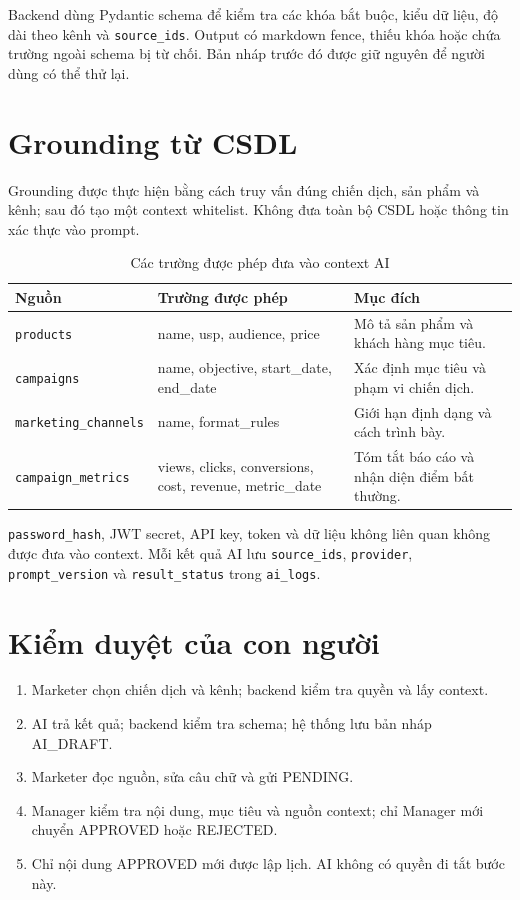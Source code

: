 Backend dùng Pydantic schema để kiểm tra các khóa bắt buộc, kiểu dữ liệu, độ dài theo kênh và \texttt{source\_ids}. Output có markdown fence, thiếu khóa hoặc chứa trường ngoài schema bị từ chối. Bản nháp trước đó được giữ nguyên để người dùng có thể thử lại.

\section{Grounding từ CSDL}

Grounding được thực hiện bằng cách truy vấn đúng chiến dịch, sản phẩm và kênh; sau đó tạo một context whitelist. Không đưa toàn bộ CSDL hoặc thông tin xác thực vào prompt.

\begin{table}[h!]
\centering
\small
\caption{Các trường được phép đưa vào context AI}
\begin{tabularx}{\textwidth}{|L{3.5cm}|Y|Y|}
\hline
\textbf{Nguồn} & \textbf{Trường được phép} & \textbf{Mục đích}\\\hline
\texttt{products} & name, usp, audience, price & Mô tả sản phẩm và khách hàng mục tiêu.\\\hline
\texttt{campaigns} & name, objective, start\_date, end\_date & Xác định mục tiêu và phạm vi chiến dịch.\\\hline
\texttt{marketing\_channels} & name, format\_rules & Giới hạn định dạng và cách trình bày.\\\hline
\texttt{campaign\_metrics} & views, clicks, conversions, cost, revenue, metric\_date & Tóm tắt báo cáo và nhận diện điểm bất thường.\\\hline
\end{tabularx}
\end{table}

\texttt{password\_hash}, JWT secret, API key, token và dữ liệu không liên quan không được đưa vào context. Mỗi kết quả AI lưu \texttt{source\_ids}, \texttt{provider}, \texttt{prompt\_version} và \texttt{result\_status} trong \texttt{ai\_logs}.

\section{Kiểm duyệt của con người}

\begin{enumerate}
  \item Marketer chọn chiến dịch và kênh; backend kiểm tra quyền và lấy context.
  \item AI trả kết quả; backend kiểm tra schema; hệ thống lưu bản nháp AI\_DRAFT.
  \item Marketer đọc nguồn, sửa câu chữ và gửi PENDING.
  \item Manager kiểm tra nội dung, mục tiêu và nguồn context; chỉ Manager mới chuyển APPROVED hoặc REJECTED.
  \item Chỉ nội dung APPROVED mới được lập lịch. AI không có quyền đi tắt bước này.
\end{enumerate}

